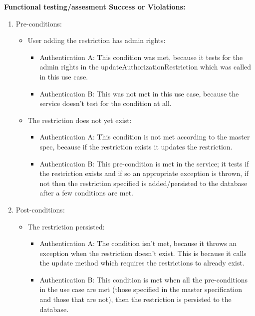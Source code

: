 \textbf{Functional testing/assesment Success or Violations:}
\begin{enumerate}
	\item Pre-conditions:
	
	\begin{itemize}
		\item User adding the restriction has admin rights:
		\begin{itemize}
				\item Authentication A: This condition was met, because it tests for the admin rights in the updateAuthorizationRestriction which was called in this use case.
				\item Authentication B: This was not met in
this use case, because the service doesn't test for the condition at all.
		\end{itemize}
		\item The restriction does not yet exist:
		\begin{itemize}
				\item Authentication A: This condition is not met according to the master spec, because if the restriction exists it updates the restriction. 
				\item Authentication B: This pre-condition is met in the service;
it tests if the restriction exists and if so an appropriate exception is thrown,
if not then the restriction specified is added/persisted to the database after a few conditions are met.
		\end{itemize}
	\end{itemize}

	\item Post-conditions:
	\begin{itemize}
		\item The restriction persisted:
			\begin{itemize}
			\item Authentication A: The condition isn't met, because it throws an exception when the restriction doesn't exist. This is because it calls the update method which requires the restrictions to already exist.
			\item Authentication B: This condition is met when all the pre-conditions in the use case are met (those specified in the master specification and those that are not), then the restriction is persisted to the database.				
			\end{itemize}
			
	\end{itemize}
		
\end{enumerate}

